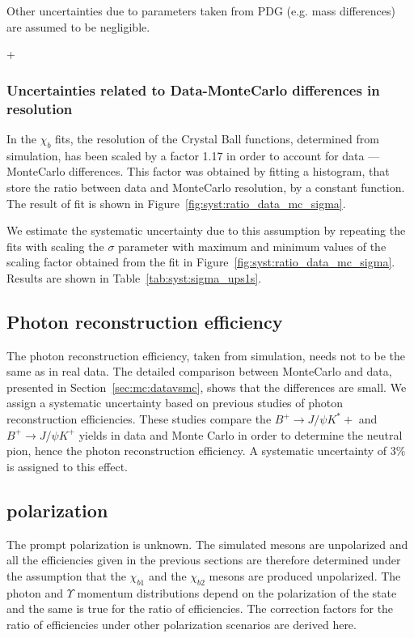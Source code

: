  Other uncertainties due to parameters taken from PDG (e.g. mass differences)
 are assumed to be negligible.
 
+\subsubsection{Uncertainties related to Data-MonteCarlo differences in resolution}
 
In the $\chi_b$ fits, the resolution of the Crystal Ball functions, determined
from simulation, has been scaled by a factor 1.17 in order to account for data
--- MonteCarlo differences. This factor was obtained by fitting a histogram,
that store the ratio between data and MonteCarlo resolution, by a constant
function. The result of fit is shown in
Figure~\ref{fig:syst:ratio_data_mc_sigma}.
 



We estimate the systematic uncertainty due to this assumption by repeating the
fits with scaling the $\sigma$ parameter with maximum and minimum values of
the scaling factor obtained from the fit in Figure~\ref{fig:syst:ratio_data_mc_sigma}.
Results are shown in Table~\ref{tab:syst:sigma_ups1s}.



\subsection{Photon reconstruction efficiency}
The photon reconstruction efficiency, taken from simulation, needs not to be
the same as in real data. The detailed comparison between MonteCarlo and data,
presented in Section~\ref{sec:mc:datavsmc}, shows that the differences
are small. We assign a systematic uncertainty based on previous studies of
photon reconstruction efficiencies. These studies compare the $B^+ \rightarrow
J/\psi K^*+$ and $B^+ \rightarrow J/\psi K^+$ yields in data and Monte Carlo in
order to determine the neutral pion, hence the photon  reconstruction
efficiency. A systematic uncertainty of 3\% is assigned to this effect.






\subsection{\chib polarization}
\label{sec:syst:pol}

The prompt \chib polarization is unknown. The simulated \chib mesons are
unpolarized and all the efficiencies given in the previous sections are
therefore determined under the assumption that the $\chi_{b1}$ and the
$\chi_{b2}$ mesons are produced unpolarized. The photon and $\Upsilon$ momentum
distributions depend on the polarization of the \chib state and the same is
true for the ratio of efficiencies. The correction factors for the ratio of
efficiencies under other polarization scenarios are derived here.

